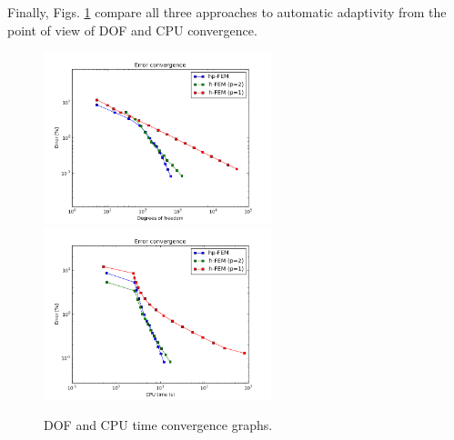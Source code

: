 Finally, Figs. \ref{fig:nist-2-conv} compare all
three approaches to automatic adaptivity from the point
of view of DOF and CPU convergence.

\begin{figure}[!ht]
\centering
\includegraphics[height=5cm]{nist/nist-2/conv_dof_aniso.png}\ \
\includegraphics[height=5cm]{nist/nist-2/conv_cpu_aniso.png}
\caption{DOF and CPU time convergence graphs.}
\label{fig:nist-2-conv}
\end{figure}

